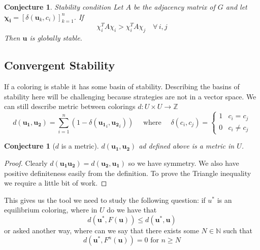 \documentclass[]{article}
\newtheorem{conjecture}[theorem]{Conjecture}
\begin{document}
\begin{conjecture}{Stability condition}
		Let $A$ be the adjacency matrix of $G$ and let $\mathbf{\chi_i} = [\delta(\mathbf{u}_k,c_i)]_{k=1}^n$. If \begin{equation}
			\chi_i^TA\chi_i>\chi_i^TA\chi_j\quad \forall \, i, j
		\end{equation}
		Then $\mathbf{u}$ is globally stable. 
	
\end{conjecture}

\subsection{Convergent Stability}
If a coloring is stable it has some basin of stability. Describing the basins of stability here will be challenging because strategies are not in a vector space. We can still describe metric between colorings $d:U\times U \rightarrow \mathbb{Z}$
\begin{equation}
	d(\mathbf{u_1},\mathbf{u_2})=\sum_{i=1}^n (1-\delta(\mathbf{u_1}_i,\mathbf{u_2}_i)) \quad \text{ where }\quad  \delta(c_i,c_j)=\begin{cases}
		1 & c_i=c_j\\
		0 & c_i\neq c_j
	\end{cases}
\end{equation}

\begin{conjecture}[$d$ is a metric]
	$d(\mathbf{u_1},\mathbf{u_2})$ ad defined above is a metric in $U$. 
\end{conjecture}

\begin{proof}
	Clearly $d(\mathbf{u_1}\mathbf{u_2})=d(\mathbf{u_2},\mathbf{u_1})$ so we have symmetry. We also have positive definiteness easily from the definition. To prove the Triangle inequality we require a little bit of work. 
\end{proof}

This gives us the tool we need to study the following question: if $u^*$ is an equilibrium coloring, where in $U$ do we have that 
\begin{equation}
	d(\mathbf{u^*},F(\mathbf{u}))\leq d(\mathbf{u^*},\mathbf{u})
\end{equation}
or asked another way, where can we say that there exists some $N\in \mathbb{N}$ such that 
\begin{equation}
	d(\mathbf{u^*},F^n(\mathbf{u}))=0 \text{ for } n\geq N
\end{equation}
\end{document}
